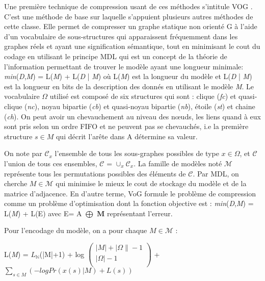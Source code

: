 
Une première technique de compression usant de ces méthodes s'intitule VOG \citep{koutra2015summarizing}. C'est une méthode de base sur laquelle s'appuient plusieurs autres méthodes de cette classe. Elle permet de compresser un graphe statique non orienté G à l'aide d'un vocabulaire de sous-structures qui apparaissent fréquemment dans les graphes réels et ayant  une signification sémantique, tout en minimisant le cout du codage en utilisant le principe MDL qui est un concept de la théorie de l'information permettant de trouver le modèle ayant une longueur minimale: \textit{min}(\textit{D},\textit{M}) = L(\textit{M}) + L(\textit{D} | \textit{M}) où L(\textit{M}) est la longueur du modèle et L(\textit{D} | \textit{M}) est la longueur en bits de la description des donnés en utilisant le modèle \textit{M}. 
Le vocabulaire $\Omega$ utilisé est composé de six structures qui sont : clique (\textit{fc}) et quasi-clique (\textit{nc}), noyau bipartie (\textit{cb}) et quasi-noyau bipartie (\textit{nb}), étoile (\textit{st}) et chaine (\textit{ch}). On peut avoir un chevauchement au niveau des nœuds, les liens quand à eux sont pris selon un ordre FIFO et ne peuvent pas se chevauchés, i.e la première structure $ s \in \textit{M} $ qui décrit l'arête dans A détermine sa valeur.

On note par $\mathcal{C}_{x}$ l'ensemble de tous les sous-graphes possibles de type $x \in \Omega$, et $\mathcal{C}$ l'union de tous ces ensembles, $\mathcal{C}$ = ${\cup}_{x}\mathcal{C}_{x}$. La famille de modèles noté $\mathcal{M}$ représente tous les permutations possibles des éléments de $\mathcal{C}$. Par MDL, on cherche $\textit{M} \in \mathcal{M}$ qui minimise le mieux le cout de stockage du modèle et de la matrice d'adjacence.
En d'autre terme, VoG formule le problème de compression comme un problème d'optimisation dont la fonction objective est :
 \textit{min}(\textit{D},\textit{M}) = L(\textit{M}) + L(E) avec E= A $\bigoplus$ $\mathbf{M} $ représentant l'erreur. 

Pour l'encodage du modèle, on a pour chaque $\textit{M} \in  \mathcal{M}$ : 

\begin{center}
L(\textit{M}) = $L_{\mathbb{N}}$(|M|+1) + log $\left( \begin{array}{c}
|\textit{M}| + |\Omega\| -1 \\
|\Omega| -1 \\
\end{array} \right)$ + $\sum\limits_{s  \in \textit{M}} ( - log Pr(x(s)  |  \textit{M} ) + L(s) )$\\
\end{center}

